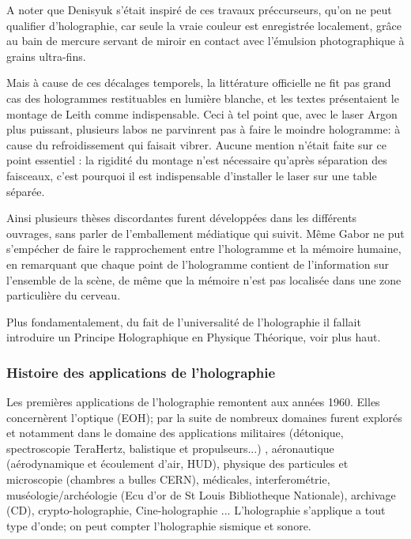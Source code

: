 \documentclass[a4paper,12pt]{article}
\begin{document}
A noter que Denisyuk s'était inspiré de ces travaux préccurseurs, qu'on ne peut qualifier d'holographie, car seule la vraie couleur est enregistrée localement, gr\^ace au bain de mercure servant de miroir en contact avec l'émulsion photographique à grains ultra-fins.


Mais à cause de ces décalages temporels, la littérature officielle ne fit pas grand cas des hologrammes restituables en lumière blanche, et les textes présentaient le montage de Leith comme indispensable. Ceci à tel point que, avec le laser Argon plus puissant, plusieurs labos ne parvinrent pas à faire le moindre hologramme: à cause du refroidissement qui faisait vibrer. Aucune mention n'était faite sur ce point essentiel : la rigidité du montage n'est nécessaire qu'après séparation des faisceaux, c'est pourquoi il est indispensable d'installer le laser sur une table séparée.


Ainsi plusieurs thèses discordantes furent développées dans les différents ouvrages, sans parler de l'emballement médiatique qui suivit. Même Gabor ne put s'empécher de faire le rapprochement entre l'hologramme et la mémoire humaine, en remarquant que chaque point de l'hologramme contient de l'information sur l'ensemble de la scène, de même que la mémoire n'est pas localisée dans une zone particulière du cerveau.


Plus fondamentalement, du fait de l'universalité de l'holographie il fallait introduire un Principe Holographique en Physique Théorique, voir plus haut.




\subsubsection{Histoire des applications de l'holographie}

Les premières applications de l'holographie remontent aux années 1960. Elles concernèrent l'optique (EOH); par la suite de nombreux domaines furent explorés et notamment dans le domaine des applications militaires (détonique, spectroscopie TeraHertz, balistique et propulseurs...) \cite{ISL}, aéronautique (aérodynamique et écoulement d'air, HUD), physique des particules et microscopie (chambres a bulles CERN), médicales, interferométrie, muséologie/archéologie (Ecu d'or de St Louis Bibliotheque Nationale), archivage (CD), crypto-holographie, Cine-holographie \cite{Bjelkhagen} ...
L'holographie s'applique a tout type d'onde; on peut compter l'holographie sismique et sonore.
\end{document}
